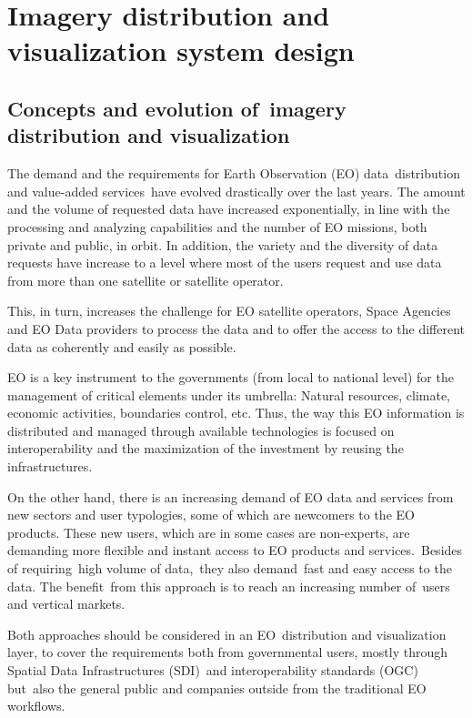 \documentclass[a4paper]{article}
\begin{document}
\section[Imagery distribution and visualization system design]{Imagery
distribution and visualization system design}
\label{bkm:Ref378924071}\hypertarget{Toc381777201}{}\subsection[Concepts
and evolution of\ imagery distribution and visualization]{Concepts and
evolution of\ imagery distribution and visualization}
\label{bkm:Ref379210422}\hypertarget{Toc381777202}{}The demand and the
requirements for Earth Observation (EO) data\ distribution and
value-added services\ have evolved drastically over the last years. The
amount and the volume of requested data have increased exponentially,
in line with the processing and analyzing capabilities and the number
of EO missions, both private and public, in orbit. In addition, the
variety and the diversity of data requests have increase to a level
where most of the users request and use data from more than one
satellite or satellite operator.

This, in turn, increases the challenge for EO satellite operators, Space
Agencies and EO Data providers to process the data and to offer the
access to the different data as coherently and easily as possible.

EO is a key instrument to the governments (from local to national level)
for the management of critical elements under its umbrella: Natural
resources, climate, economic activities, boundaries control, etc. Thus,
the way this EO information is distributed and managed through
available technologies is focused on interoperability and the
maximization of the investment by reusing the infrastructures.\ 

On the other hand, there is an increasing demand of EO data and services
from new sectors and user typologies, some of which are newcomers to
the EO products. These new users, which are in some cases are
non-experts, are demanding more flexible and instant access to EO
products and services.\ Besides of requiring\ high volume of
data,\ they also demand\ fast and easy access to the data. The
benefit\ from this approach is to reach an increasing number of\ users
and vertical markets.

Both approaches should be considered in an EO\ distribution and
visualization layer, to cover the requirements both from governmental
users, mostly through Spatial Data Infrastructures (SDI)\ and
interoperability standards (OGC) but\ also the general public and
companies outside from the traditional EO workflows.
\end{document}
